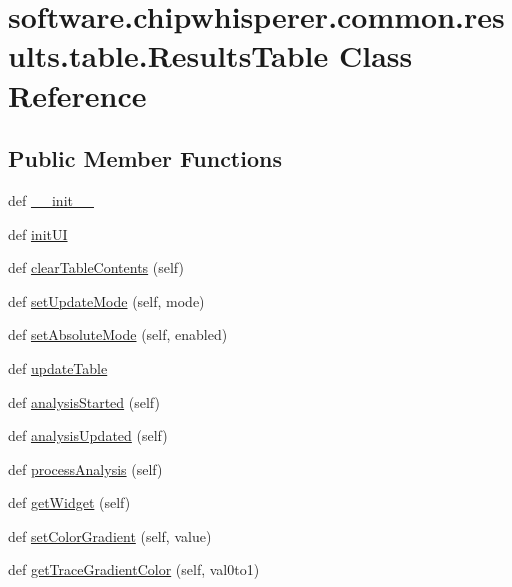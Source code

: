 \hypertarget{classsoftware_1_1chipwhisperer_1_1common_1_1results_1_1table_1_1ResultsTable}{}\section{software.\+chipwhisperer.\+common.\+results.\+table.\+Results\+Table Class Reference}
\label{classsoftware_1_1chipwhisperer_1_1common_1_1results_1_1table_1_1ResultsTable}
\subsection*{Public Member Functions}
\begin{DoxyCompactItemize}
\item 
def \hyperlink{classsoftware_1_1chipwhisperer_1_1common_1_1results_1_1table_1_1ResultsTable_a62b8a696d629507f37373514975335f7}{\+\_\+\+\_\+init\+\_\+\+\_\+}
\item 
def \hyperlink{classsoftware_1_1chipwhisperer_1_1common_1_1results_1_1table_1_1ResultsTable_adb96cac5f77429fef3e636b4dbafced6}{init\+U\+I}
\item 
def \hyperlink{classsoftware_1_1chipwhisperer_1_1common_1_1results_1_1table_1_1ResultsTable_ae9571e10f9e020f082e1212af9eeb081}{clear\+Table\+Contents} (self)
\item 
def \hyperlink{classsoftware_1_1chipwhisperer_1_1common_1_1results_1_1table_1_1ResultsTable_a0132f36010a0aa713f7274c0060ac07d}{set\+Update\+Mode} (self, mode)
\item 
def \hyperlink{classsoftware_1_1chipwhisperer_1_1common_1_1results_1_1table_1_1ResultsTable_a31c0860df49cc902dffc13d92821a45b}{set\+Absolute\+Mode} (self, enabled)
\item 
def \hyperlink{classsoftware_1_1chipwhisperer_1_1common_1_1results_1_1table_1_1ResultsTable_a9ab46feba7b80d80888dae7342a4c7c9}{update\+Table}
\item 
def \hyperlink{classsoftware_1_1chipwhisperer_1_1common_1_1results_1_1table_1_1ResultsTable_afa62a8ad6b3ccdde13a8b1d74d21ea4c}{analysis\+Started} (self)
\item 
def \hyperlink{classsoftware_1_1chipwhisperer_1_1common_1_1results_1_1table_1_1ResultsTable_a145a356c2d9f478eebb2f720ba894935}{analysis\+Updated} (self)
\item 
def \hyperlink{classsoftware_1_1chipwhisperer_1_1common_1_1results_1_1table_1_1ResultsTable_a2c53a9ae0034a0aa7e401f9437e2d4a1}{process\+Analysis} (self)
\item 
def \hyperlink{classsoftware_1_1chipwhisperer_1_1common_1_1results_1_1table_1_1ResultsTable_adb7ed74e1c25d16ef4dba3f92708a04a}{get\+Widget} (self)
\item 
def \hyperlink{classsoftware_1_1chipwhisperer_1_1common_1_1results_1_1table_1_1ResultsTable_a9f359f66206af231077ad41ce76a2e06}{set\+Color\+Gradient} (self, value)
\item 
def \hyperlink{classsoftware_1_1chipwhisperer_1_1common_1_1results_1_1table_1_1ResultsTable_abac77a414555f50fde9e67208c2188d3}{get\+Trace\+Gradient\+Color} (self, val0to1)
\end{DoxyCompactItemize}
